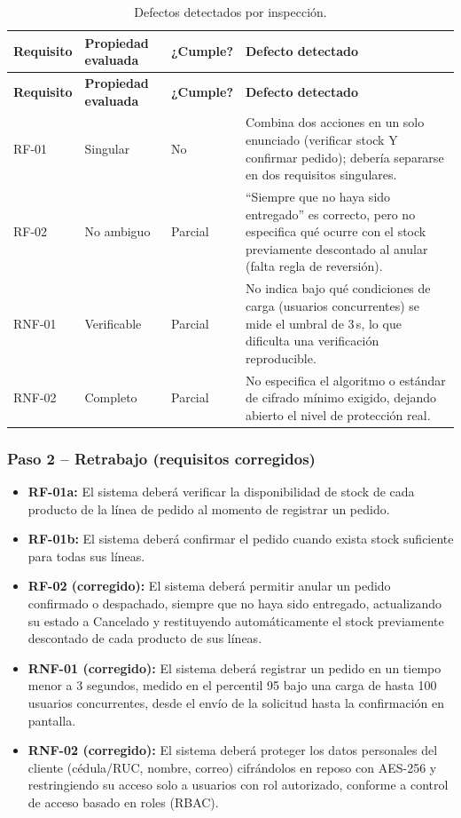 \documentclass[11pt]{article}
\begin{document}
\begin{longtable}{p{1.6cm}p{2.3cm}p{1.5cm}p{8.5cm}}
\caption{Defectos detectados por inspección.}\\
\toprule
\textbf{Requisito} & \textbf{Propiedad evaluada} & \textbf{¿Cumple?} & \textbf{Defecto detectado} \\
\midrule
\endfirsthead
\toprule
\textbf{Requisito} & \textbf{Propiedad evaluada} & \textbf{¿Cumple?} & \textbf{Defecto detectado} \\
\midrule
\endhead
RF-01 & Singular & No & Combina dos acciones en un solo enunciado (verificar stock Y confirmar pedido);
debería separarse en dos requisitos singulares. \\
RF-02 & No ambiguo & Parcial & ``Siempre que no haya sido entregado'' es correcto, pero no especifica qué
ocurre con el stock previamente descontado al anular (falta regla de reversión). \\
RNF-01 & Verificable & Parcial & No indica bajo qué condiciones de carga (usuarios concurrentes) se mide
el umbral de 3\,s, lo que dificulta una verificación reproducible. \\
RNF-02 & Completo & Parcial & No especifica el algoritmo o estándar de cifrado mínimo exigido, dejando
abierto el nivel de protección real. \\
\bottomrule
\end{longtable}

\subsubsection*{Paso 2 -- Retrabajo (requisitos corregidos)}
\begin{itemize}[leftmargin=1.2cm]
  \item \textbf{RF-01a:} El sistema deberá verificar la disponibilidad de stock de cada producto de la
  línea de pedido al momento de registrar un pedido.
  \item \textbf{RF-01b:} El sistema deberá confirmar el pedido cuando exista stock suficiente para todas
  sus líneas.
  \item \textbf{RF-02 (corregido):} El sistema deberá permitir anular un pedido confirmado o despachado,
  siempre que no haya sido entregado, actualizando su estado a Cancelado y restituyendo automáticamente el
  stock previamente descontado de cada producto de sus líneas.
  \item \textbf{RNF-01 (corregido):} El sistema deberá registrar un pedido en un tiempo menor a 3
  segundos, medido en el percentil 95 bajo una carga de hasta 100 usuarios concurrentes, desde el envío de
  la solicitud hasta la confirmación en pantalla.
  \item \textbf{RNF-02 (corregido):} El sistema deberá proteger los datos personales del cliente
  (cédula/RUC, nombre, correo) cifrándolos en reposo con AES-256 y restringiendo su acceso solo a usuarios
  con rol autorizado, conforme a control de acceso basado en roles (RBAC).
\end{itemize}
\end{document}
